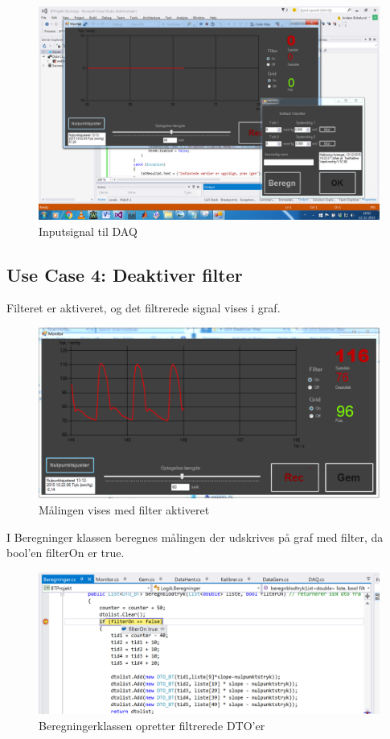 \begin{figure}[H]
	\centering
	\includegraphics[width=1\textwidth]{Figurer/Test_Nul_3}
	\caption{Inputsignal til DAQ}
\end{figure}


\subsection{Use Case 4: Deaktiver filter}

Filteret er aktiveret, og det filtrerede signal vises i graf.

\begin{figure}[H]
	\centering
	\includegraphics[width=1\textwidth]{Figurer/Test_Deaktiver_1}
	\caption{Målingen vises med filter aktiveret}
\end{figure}

I Beregninger klassen beregnes målingen der udskrives på graf med filter, da bool'en filterOn er true.

\begin{figure}[H]
	\centering
	\includegraphics[width=1\textwidth]{Figurer/Test_Deaktiver_2}
	\caption{Beregningerklassen opretter filtrerede DTO'er}
\end{figure}

